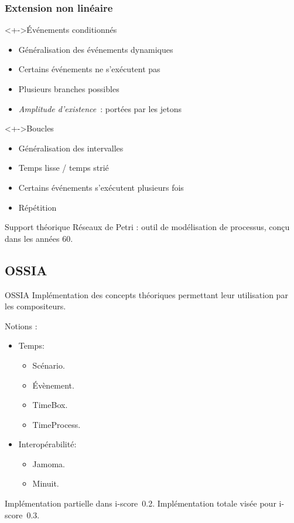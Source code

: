 \begin{frame}
	\frametitle{Extension non linéaire}
	\begin{block}<+->{Événements conditionnés}
		\begin{itemize}
			\item Généralisation des événements dynamiques
			\item Certains événements ne s'exécutent pas
			\item Plusieurs branches possibles
			\item \emph{Amplitude d'existence}~: portées par les jetons
		\end{itemize}
	\end{block}
	
	\begin{block}<+->{Boucles}
		\begin{itemize}
			\item Généralisation des intervalles
			\item Temps lisse / temps strié
			\item Certains événements s'exécutent plusieurs fois
			\item Répétition
		\end{itemize}
	\end{block}
\end{frame}

\begin{frame}{Support théorique}
	Réseaux de Petri : outil de modélisation de processus, conçu dans les années 60.
\end{frame}

\subsection{OSSIA}
\begin{frame}{OSSIA}
	Implémentation des concepts théoriques permettant leur utilisation par les compositeurs.
	
	Notions : 
	\begin{itemize}
		\item{Temps:
		\begin{itemize}
			\item Scénario.
			\item Évènement.
			\item TimeBox.
			\item TimeProcess.
		\end{itemize}
		}
		
		\item{Interopérabilité:
		\begin{itemize}
			\item Jamoma.
			\item Minuit.
		\end{itemize}
	}
	\end{itemize}
	
	\begin{itemize}
		\itemar Implémentation partielle dans i-score~0.2.
		\itemar Implémentation totale visée pour i-score~0.3.
	\end{itemize}
\end{frame}